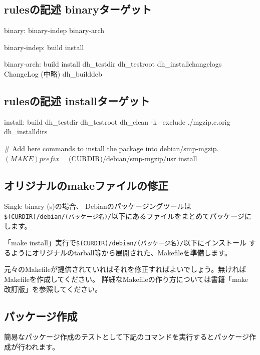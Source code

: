 \documentclass[mingoth,a4paper]{jsarticle}
\begin{document}
\subsection{rulesの記述 binaryターゲット}
\begin{commandline}
 binary: binary-indep binary-arch

 binary-indep: build install

 binary-arch: build install
        dh_testdir
        dh_testroot
        dh_installchangelogs ChangeLog
       (中略)
        dh_builddeb
\end{commandline}

\subsection{rulesの記述 installターゲット}
\begin{commandline}
 install: build
        dh_testdir
        dh_testroot
        dh_clean -k  --exclude ./mgzip.c.orig
        dh_installdirs

        # Add here commands to install the package into debian/smp-mgzip.
        $(MAKE) prefix=$(CURDIR)/debian/smp-mgzip/usr install
\end{commandline}

\subsection{オリジナルのmakeファイルの修正}
Single binary (s)の場合、
Debianのパッケージングツールは\verb!$(CURDIR)/debian/(パッケージ名)/!以下にあるファイルをまとめてパッケージにします。

「make install」実行で\verb!$(CURDIR)/debian/(パッケージ名)/!以下にインストール
するようにオリジナルのtarball等から展開された、Makefileを準備します。

元々のMakefileが提供されていればそれを修正すればよいでしょう。無ければMakefileを作成してください。
詳細なMakefileの作り方については書籍「make 改訂版」を参照してください。

\subsection{パッケージ作成}

簡易なパッケージ作成のテストとして下記のコマンドを実行するとパッケージ作成が行われます。
\end{document}
